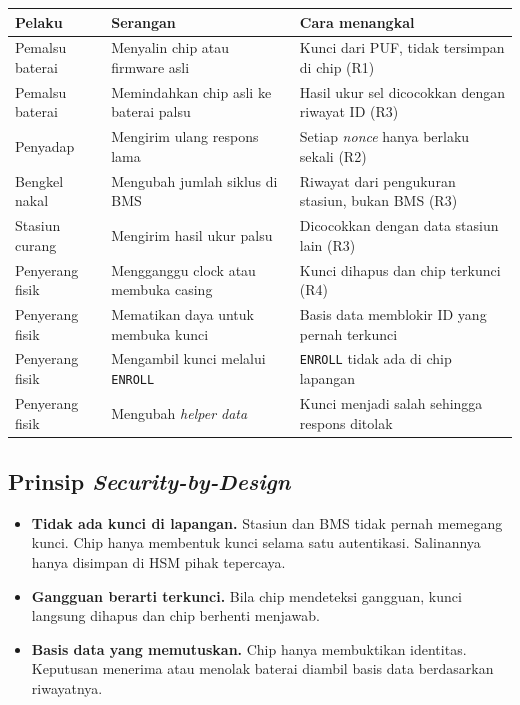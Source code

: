 \documentclass[11pt,a4paper]{article}
\newcommand{\hdr}[1]{\cellcolor{hdrgreen}\textbf{#1}}
\renewcommand{\arraystretch}{1.3}
\begin{document}
\begin{center}
\footnotesize
\renewcommand{\arraystretch}{1.2}
\begin{tabularx}{\linewidth}{|>{\raggedright\arraybackslash}p{2.3cm}|>{\raggedright\arraybackslash}X|>{\raggedright\arraybackslash}p{6.6cm}|}
\hline
\hdr{Pelaku} & \hdr{Serangan} & \hdr{Cara menangkal} \\ \hline
Pemalsu baterai & Menyalin chip atau firmware asli & Kunci dari PUF, tidak tersimpan di chip (R1) \\ \hline
Pemalsu baterai & Memindahkan chip asli ke baterai palsu & Hasil ukur sel dicocokkan dengan riwayat ID (R3) \\ \hline
Penyadap & Mengirim ulang respons lama & Setiap \emph{nonce} hanya berlaku sekali (R2) \\ \hline
Bengkel nakal & Mengubah jumlah siklus di BMS & Riwayat dari pengukuran stasiun, bukan BMS (R3) \\ \hline
Stasiun curang & Mengirim hasil ukur palsu & Dicocokkan dengan data stasiun lain (R3) \\ \hline
Penyerang fisik & Mengganggu clock atau membuka casing & Kunci dihapus dan chip terkunci (R4) \\ \hline
Penyerang fisik & Mematikan daya untuk membuka kunci & Basis data memblokir ID yang pernah terkunci \\ \hline
Penyerang fisik & Mengambil kunci melalui \texttt{ENROLL} & \texttt{ENROLL} tidak ada di chip lapangan \\ \hline
Penyerang fisik & Mengubah \emph{helper data} & Kunci menjadi salah sehingga respons ditolak \\ \hline
\end{tabularx}
\end{center}

\subsection{Prinsip \emph{Security-by-Design}}

\begin{itemize}
  \item \textbf{Tidak ada kunci di lapangan.} Stasiun dan BMS tidak pernah memegang kunci. Chip hanya membentuk kunci selama satu autentikasi. Salinannya hanya disimpan di HSM pihak tepercaya.
  \item \textbf{Gangguan berarti terkunci.} Bila chip mendeteksi gangguan, kunci langsung dihapus dan chip berhenti menjawab.
  \item \textbf{Basis data yang memutuskan.} Chip hanya membuktikan identitas. Keputusan menerima atau menolak baterai diambil basis data berdasarkan riwayatnya.
\end{itemize}
\end{document}
